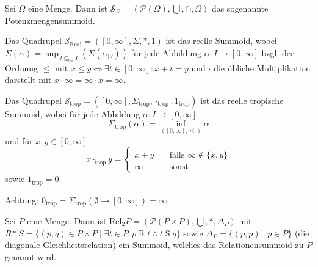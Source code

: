 \documentclass{article}
\begin{document}
\begin{example}
  Sei $\Omega$ eine Menge. Dann ist $\mathcal{S}_\Omega = (\mathcal{P}(\Omega), \bigcup, \cap, \Omega)$ 
  das sogenannte Potenzmengensummoid.
\end{example}

\begin{example}
  Das Quadrupel $\mathcal{S}_\text{Real} = ([0, \infty], \Sigma, \ast, 1)$ ist das reelle Summoid,
  wobei $\Sigma(\alpha) = \sup_{J \subseteq_\text{fin} I}(\Sigma(\alpha_{\mid J}))$ für jede Abbildung $\alpha \colon I \to[0, \infty]$
  bzgl. der Ordnung $\leq$ mit $x \leq y \iff \exists t \in [0, \infty] \colon x + t = y$ und
  $\cdot$ die übliche Multiplikation darstellt mit $x \cdot \infty = \infty \cdot x = \infty$.
\end{example}

\begin{example}
  Das Quadrupel $\mathcal{S}_\text{trop} = ([0, \infty], \Sigma_\text{trop}, \cdot_\text{trop}, 1_\text{trop})$
  ist das reelle tropische Summoid, wobei für jede Abbildung $\alpha \colon I \to [0, \infty]$
  \begin{equation*}
    \Sigma_\text{trop}(\alpha) = \inf_{([0, \infty], \leq)}\alpha
  \end{equation*}
  und für $x, y \in [0, \infty]$
  \begin{equation*}
    x \cdot_\text{trop} y = 
    \begin{cases}
      x + y &\quad\text{falls } \infty \notin \{x, y\} \\
      \infty &\quad\text{sonst}
    \end{cases} 
  \end{equation*}
  sowie $1_\text{trop} = 0$.

  Achtung: $0_\text{trop} = \Sigma_\text{trop}(\emptyset \to [0, \infty]) = \infty$.
\end{example}

\begin{example}\label{Exmaple_Relationensummoid}
  Sei $P$ eine Menge. Dann ist $\text{Rel}_2P = (\mathcal{P}(P \times P), \bigcup, \ast, \Delta_P)$ mit
  $R \ast S = \{(p, q) \in P \times P \mid \exists t \in P \colon p \mathrel{R} t \wedge t \mathrel{S} q\}$
  sowie $\Delta_P = \{(p, p) \mid p \in P\}$ (die diagonale Gleichheitsrelation) ein Summoid,
  welches das Relationensummoid zu $P$ genannt wird.
\end{example}
\end{document}
